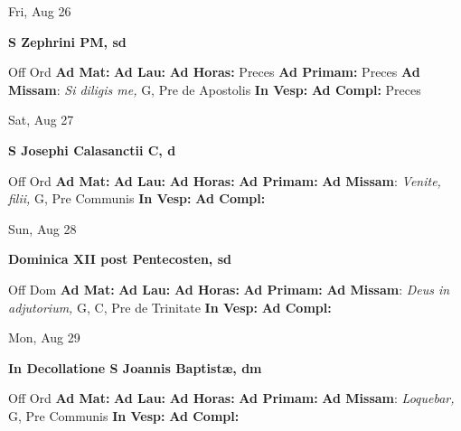 \documentclass[10pt]{article}
\begin{document}
\begin{minipage}{3.5in}
\vspace{2em}\begin{center}
Fri, Aug 26
\end{center}\textbf{ \large S Zephrini PM, \textnormal{\normalsize sd}}
\begin{justify}
Off Ord
\textbf{Ad Mat: }
\textbf{Ad Lau: }
\textbf{Ad Horas: }Preces
\textbf{Ad Primam: }Preces
\textbf{Ad Missam}: \textit{Si diligis me,} G, Pre de Apostolis
\textbf{In Vesp: }
\textbf{Ad Compl: }Preces\end{justify}
\end{minipage}



\begin{minipage}{3.5in}
\vspace{2em}\begin{center}
Sat, Aug 27
\end{center}\textbf{ \large S Josephi Calasanctii C, \textnormal{\normalsize d}}
\begin{justify}
Off Ord
\textbf{Ad Mat: }
\textbf{Ad Lau: }
\textbf{Ad Horas: }
\textbf{Ad Primam: }
\textbf{Ad Missam}: \textit{Venite, filii,} G, Pre Communis
\textbf{In Vesp: }
\textbf{Ad Compl: }\end{justify}
\end{minipage}



\begin{minipage}{3.5in}
\vspace{2em}\begin{center}
Sun, Aug 28
\end{center}\textbf{ \large Dominica XII post Pentecosten, \textnormal{\normalsize sd}}
\begin{justify}
Off Dom
\textbf{Ad Mat: }
\textbf{Ad Lau: }
\textbf{Ad Horas: }
\textbf{Ad Primam: }
\textbf{Ad Missam}: \textit{Deus in adjutorium,} G, C, Pre de Trinitate
\textbf{In Vesp: }
\textbf{Ad Compl: }\end{justify}
\end{minipage}



\begin{minipage}{3.5in}
\vspace{2em}\begin{center}
Mon, Aug 29
\end{center}\textbf{ \large In Decollatione S Joannis Baptistæ, \textnormal{\normalsize dm}}
\begin{justify}
Off Ord
\textbf{Ad Mat: }
\textbf{Ad Lau: }
\textbf{Ad Horas: }
\textbf{Ad Primam: }
\textbf{Ad Missam}: \textit{Loquebar,} G, Pre Communis
\textbf{In Vesp: }
\textbf{Ad Compl: }\end{justify}
\end{minipage}
\end{document}
